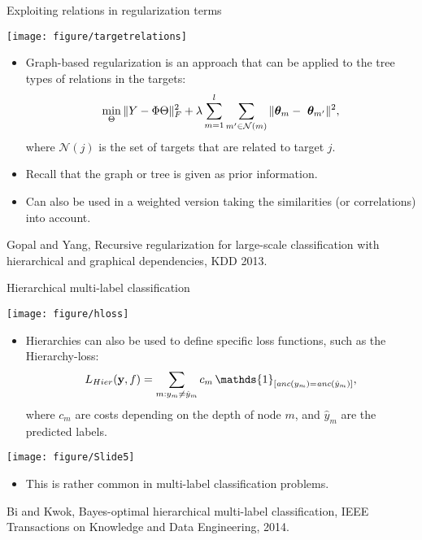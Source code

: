\documentclass[11pt,compress,t,notes=noshow, xcolor=table]{beamer}
\begin{document}
\begin{frame}{Exploiting relations in regularization terms}
	\footnotesize
%
	\begin{center}
		\texttt{[image: figure/targetrelations]}
	\end{center} 
%	
	\begin{itemize}
%		
		\item 	Graph-based regularization is an approach that can be applied to the tree types of relations in the targets: 
		\begin{equation*}
			\min_\Theta \|Y - \Phi \Theta \|^2_F + \lambda \sum_{m=1}^l \sum_{m' \in \mathcal{N}(m)} \|\thetab_m - \ \thetab_{m'}\|^2,
		\end{equation*}
		where $\mathcal{N}(j)$ is the set of targets that are related to target $j.$
        \item Recall that the graph or tree is given as prior information.
%		
		\item Can also be used in a weighted version taking the similarities (or correlations) into account.
%		
	\end{itemize}
	
%
	{\tiny Gopal and Yang, Recursive regularization for large-scale classification with hierarchical and graphical dependencies, KDD 2013.}
\end{frame}

\begin{frame}{Hierarchical multi-label classification}
	\small
	\vspace{-0.2cm}
	\begin{center}
		\texttt{[image: figure/hloss]}
	\end{center}
	
	\vspace{-0.2cm}
	\begin{minipage}{0.75\textwidth}   
	\begin{itemize}
%		
		\item %
		Hierarchies can also be used to define specific loss functions, such as the Hierarchy-loss: 
		$$L_{Hier}(\yv, f) = \sum_{m: y_m \neq \hat{y}_m} c_m \, \mathds{1}_{ [\textit{anc}(y_m) = \textit{anc}(\hat{y}_m)]  },$$
		where $c_m$ are costs depending on the depth of node $m$, and $\hat{y}_m$ are the predicted labels.
%		
	\end{itemize}
\end{minipage}
\begin{minipage}{0.2\textwidth}    
	\begin{center}
		\texttt{[image: figure/Slide5]}
	\end{center}
\end{minipage}
\begin{itemize}
%	
	\item This is rather common in multi-label classification problems.
%	
\end{itemize}

	{\tiny Bi and Kwok, Bayes-optimal hierarchical multi-label classification, IEEE Transactions on Knowledge and Data Engineering, 2014.}
%
\end{frame}
\end{document}
